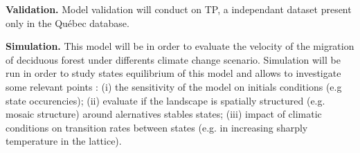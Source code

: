 \textbf{Validation.} Model validation will conduct on TP, a independant
dataset present only in the Québec database.


\textbf{Simulation.} This model will be  in order to evaluate the velocity of the
migration of deciduous forest under differents climate change scenario.
Simulation will be run in order to study states equilibrium of this model and
allows to investigate some relevant points : (i) the sensitivity of
the model on initials conditions (e.g state occurencies); (ii) evaluate if the
landscape is spatially structured (e.g. mosaic structure) around alernatives
stables states; (iii) impact of climatic conditions on transition rates
between states (e.g. in increasing sharply temperature in the lattice). \\



\clearpage
\small

